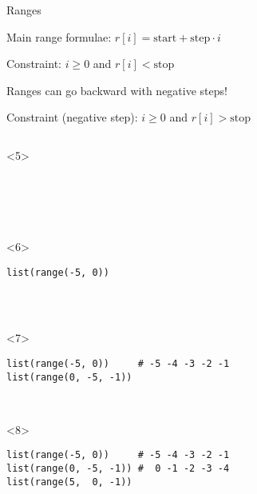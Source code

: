 \begin{frame}[fragile]{Ranges}

   Main range formulae: $ r[i] = \text{start} + \text{step} \cdot i $

   Constraint: $ i \geq 0 $ and $ r[i] < \text{stop} $

   Ranges can go backward with negative steps!

   Constraint (negative step): $ i \geq 0 $ and $ r[i] > \text{stop} $

  \medskip

  \begin{center}

  \begin{columns}[onlytextwidth]
    \begin{column}{\textwidth}

      \begin{onlyenv}<5>
        \begin{lstlisting}[style=python,morekeywords={for, in, range, list}]





 \end{lstlisting}
      \end{onlyenv}

      \begin{onlyenv}<6>
        \begin{lstlisting}[style=python,morekeywords={for, in, range, list}]
list(range(-5, 0))




 \end{lstlisting}
      \end{onlyenv}

      \begin{onlyenv}<7>
        \begin{lstlisting}[style=python,morekeywords={for, in, range, list}]
list(range(-5, 0))     # -5 -4 -3 -2 -1
list(range(0, -5, -1))



 \end{lstlisting}
      \end{onlyenv}

      \begin{onlyenv}<8>
        \begin{lstlisting}[style=python,morekeywords={for, in, range, list}]
list(range(-5, 0))     # -5 -4 -3 -2 -1
list(range(0, -5, -1)) #  0 -1 -2 -3 -4
list(range(5,  0, -1))



\end{lstlisting}
\end{onlyenv}
\end{column}
\end{columns}
\end{center}
\end{frame}
